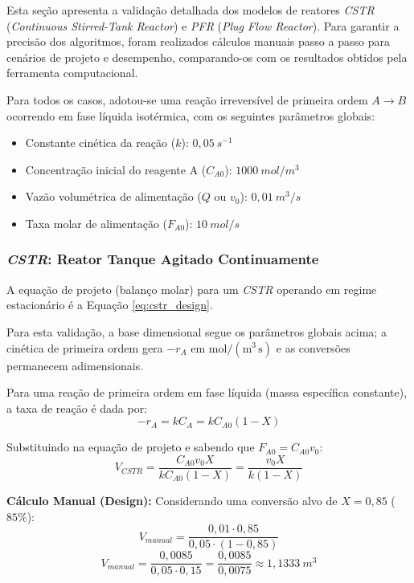 Esta seção apresenta a validação detalhada dos modelos de reatores \textit{CSTR} (\textit{Continuous Stirred-Tank Reactor}) e \textit{PFR} (\textit{Plug Flow Reactor}). Para garantir a precisão dos algoritmos, foram realizados cálculos manuais passo a passo para cenários de projeto e desempenho, comparando-os com os resultados obtidos pela ferramenta computacional.

Para todos os casos, adotou-se uma reação irreversível de primeira ordem $A \to B$ ocorrendo em fase líquida isotérmica, com os seguintes parâmetros globais:
\begin{itemize}
    \item Constante cinética da reação ($k$): $0,05 \ s^{-1}$
    \item Concentração inicial do reagente A ($C_{A0}$): $1000 \ mol/m^3$
    \item Vazão volumétrica de alimentação ($Q$ ou $v_0$): $0,01 \ m^3/s$
    \item Taxa molar de alimentação ($F_{A0}$): $10 \ mol/s$
\end{itemize}

\subsubsection{\textit{CSTR}: Reator Tanque Agitado Continuamente}

A equação de projeto (balanço molar) para um \textit{CSTR} operando em regime estacionário é a Equação \ref{eq:cstr_design}.

Para esta validação, a base dimensional segue os parâmetros globais acima; a cinética de primeira ordem gera $-r_A$ em $\mathrm{mol/(m^3\,s)}$ e as conversões permanecem adimensionais.

Para uma reação de primeira ordem em fase líquida (massa específica constante), a taxa de reação é dada por:
\begin{equation}
    -r_A = k C_A = k C_{A0} (1-X)
    \label{eq:val_rate_law}
\end{equation}

Substituindo na equação de projeto e sabendo que $F_{A0} = C_{A0} v_0$:
\begin{equation}
    V_{CSTR} = \frac{C_{A0} v_0 X}{k C_{A0} (1-X)} = \frac{v_0 X}{k (1-X)}
    \label{eq:val_cstr_vol_deriv}
\end{equation}

\textbf{Cálculo Manual (Design):}
Considerando uma conversão alvo de $X = 0,85$ ($85\%$):
\begin{equation}
    V_{manual} = \frac{0,01 \cdot 0,85}{0,05 \cdot (1 - 0,85)}
    \label{eq:val_cstr_vol_calc_1}
\end{equation}
\begin{equation}
    V_{manual} = \frac{0,0085}{0,05 \cdot 0,15} = \frac{0,0085}{0,0075} \approx 1,1333 \ m^3
    \label{eq:val_cstr_vol_calc_2}
\end{equation}


